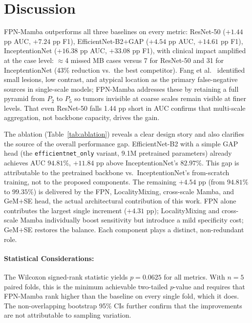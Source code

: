 \documentclass[runningheads]{llncs}
\begin{document}
\section{Discussion}
FPN-Mamba outperforms all three baselines on every metric: ResNet-50 ($+1.44$ pp AUC, $+7.24$ pp F1), EfficientNet-B2$+$GAP ($+4.54$ pp AUC, $+14.61$ pp F1), InceptentionNet ($+16.38$ pp AUC, $+33.08$ pp F1), with clinical impact amplified at the case level: $\approx$4 missed MB cases versus 7 for ResNet-50 and 31 for InceptentionNet (43\% reduction vs.\ the best competitor). Fang et al.\ \cite{fang2025} identified small lesions, low contrast, and atypical location as the primary false-negative sources in single-scale models; FPN-Mamba addresses these by retaining a full pyramid from $P_2$ to $P_5$ so tumors invisible at coarse scales remain visible at finer levels. That even ResNet-50 falls 1.44 pp short in AUC confirms that multi-scale aggregation, not backbone capacity, drives the gain.

The ablation (Table~\ref{tab:ablation}) reveals a clear design story and also clarifies the source of the overall performance gap. EfficientNet-B2 with a simple GAP head (the \texttt{efficientnet\_only} variant, 9.1M pretrained parameters) already achieves AUC $94.81\%$, $+11.84$ pp above InceptentionNet's $82.97\%$. This gap is attributable to the pretrained backbone vs.\ InceptentionNet's from-scratch training, not to the proposed components. The remaining $+4.54$ pp (from $94.81\%$ to $99.35\%$) is delivered by the FPN, LocalityMixing, cross-scale Mamba, and GeM$+$SE head, the actual architectural contribution of this work. FPN alone contributes the largest single increment ($+4.31$ pp); LocalityMixing and cross-scale Mamba individually boost sensitivity but introduce a mild specificity cost; GeM$+$SE restores the balance. Each component plays a distinct, non-redundant role.

\paragraph{Statistical Considerations:}
The Wilcoxon signed-rank statistic yields $p=0.0625$ for all metrics. With $n=5$ paired folds, this is the minimum achievable two-tailed $p$-value and requires that FPN-Mamba rank higher than the baseline on every single fold, which it does. The non-overlapping bootstrap 95\% CIs further confirm that the improvements are not attributable to sampling variation.
\end{document}
